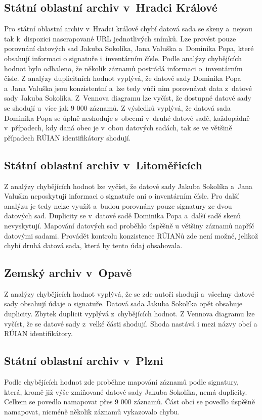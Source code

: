 \subsection{Státní oblastní archiv v~Hradci Králové}
Pro státní oblastní archiv v~Hradci králové chybí datová sada se skeny a~nejsou tak k~dispozici nascrapované URL jednotlivých snímků. Lze provést pouze porovnání datových sad Jakuba Sokolíka, Jana Valuška a~Dominika Popa, které obsahují informaci o signatuře i~inventárním čísle. Podle analýzy chybějících hodnot bylo odhaleno, že několik záznamů postrádá informaci o~inventárním čísle.
Z analýzy duplicitních hodnot vyplývá, že datové sady Dominika Popa a~Jana Valuška jsou konzistentní a~lze tedy vůči nim porovnávat data z~datové sady Jakuba Sokolíka.
Z~Vennova diagramu lze vyčíst, že dostupné datové sady se shodují u~více jak 9 000 záznamů.
Z výsledků vyplývá, že datová sada Dominika Popa se úplně neshoduje s~obcemi v~druhé datové sadě, každopádně v~případech, kdy daná obec je v~obou datových sadách, tak se ve většině případech RÚIAN identifikátory shodují.

\subsection{Státní oblastní archiv v~Litoměřicích}
Z analýzy chybějících hodnot lze vyčíst, že datové sady Jakuba Sokolíka a~Jana Valuška neposkytují informaci o signatuře ani o inventárním čísle. Pro další analýzu je tedy nelze využít a~budou porovnány pouze signatury ze dvou datových sad.
Duplicity se v~datové sadě Dominika Popa a~další sadě skenů nevyskytují. Mapování datových sad proběhlo úspěšně u většiny záznamů napříč datovými sadami.
Provádět kontrolu konzistence RÚIANů zde není možné, jelikož chybí druhá datová sada, která by tento údaj obsahovala.

\subsection{Zemský archiv v~Opavě}
Z analýzy chybějících hodnot vyplývá, že se zde autoři shodují a~všechny datové sady obsahují údaje o signatuře.
Datová sada Jakuba Sokolíka opět obsahuje duplicity. Zbytek duplicit vyplývá z~chybějících hodnot.
Z Vennova diagramu lze vyčíst, že se datové sady z~velké části shodují. Shoda nastává i mezi názvy obcí a RÚIAN identifikátory.

\subsection{Státní oblastní archiv v~Plzni}
Podle chybějících hodnot zde proběhne mapování záznamů podle signatury, která, kromě již výše zmiňované datové sady Jakuba Sokolíka, nemá duplicity. Celkem se povedlo namapovat přes 9 000 záznamů. Část obcí se povedlo úspěšně namapovat, nicméně několik záznamů vykazovalo chybu.

